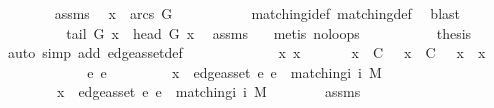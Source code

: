 \begin{isabellebody}
\ \ \ \ \ \ \isamarkupfalse%
\ assms\ \isamarkupfalse%
\ {\isachardoublequoteopen}x\ {\isasymin}\ arcs\ G{\isachardoublequoteclose}\ \isanewline
\ \ \ \ \ \ \ \ \isamarkupfalse%
\ matching{\isacharunderscore}i{\isacharunderscore}def\ matching{\isacharunderscore}def\ \isamarkupfalse%
\ blast\isanewline
\ \ \ \ \ \ \isamarkupfalse%
\ \isamarkupfalse%
\ {\isachardoublequoteopen}tail\ G\ x\ {\isasymnoteq}\ head\ G\ x{\isachardoublequoteclose}\ \isamarkupfalse%
\ assms\ {}\ \isamarkupfalse%
\ {\isacharparenleft}metis\ no{\isacharunderscore}loops{\isacharparenright}\isanewline
\ \ \ \ \ \ \isamarkupfalse%
\ {}\ \isamarkupfalse%
\ {\isacharquery}thesis\ \isamarkupfalse%
\ {\isacharparenleft}auto\ simp\ add{\isacharcolon}\ edge{\isacharunderscore}as{\isacharunderscore}set{\isacharunderscore}def{\isacharparenright}\isanewline
\ \ \ \ \isamarkupfalse%
\isanewline
\ \ \isamarkupfalse%
\isanewline
\ \ \ \ \isamarkupfalse%
\ x{}\ x{}\isanewline
\ \ \ \ \isamarkupfalse%
\ {}{\isacharcolon}\ {\isachardoublequoteopen}x{}\ {\isasymin}\ {\isacharquery}C{\isachardoublequoteclose}\ \ {}{\isacharcolon}\ {\isachardoublequoteopen}x{}\ {\isasymin}\ {\isacharquery}C{\isachardoublequoteclose}\ \ {}{\isacharcolon}\ {\isachardoublequoteopen}x{}\ {\isasymnoteq}\ x{}{\isachardoublequoteclose}\isanewline
\ \ \ \ \isacommand{{\isacharbraceleft}}\isamarkupfalse%
\isanewline
\ \ \ \ \ \ \isamarkupfalse%
\ e{}\ e{}\isanewline
\ \ \ \ \ \ \isamarkupfalse%
\ {}{\isacharcolon}\ {\isachardoublequoteopen}x{}\ {\isacharequal}\ edge{\isacharunderscore}as{\isacharunderscore}set\ e{}{\isachardoublequoteclose}\ {\isachardoublequoteopen}e{}\ {\isasymin}\ matching{\isacharunderscore}i\ i\ M{\isachardoublequoteclose}\isanewline
\ \ \ \ \ \ \ \ {\isachardoublequoteopen}x{}\ {\isacharequal}\ edge{\isacharunderscore}as{\isacharunderscore}set\ e{}{\isachardoublequoteclose}\ {\isachardoublequoteopen}e{}\ {\isasymin}\ matching{\isacharunderscore}i\ i\ M{\isachardoublequoteclose}\isanewline
\ \ \ \ \ \ \isamarkupfalse%
\ assms\ \isamarkupfalse%

\end{isabellebody}
